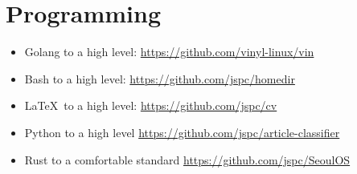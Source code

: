 \section{Programming}

\begin{itemize}
\item Golang to a high level: \href{https://github.com/vinyl-linux/vin}{https://github.com/vinyl-linux/vin}
\item Bash to a high level: \href{https://github.com/jspc/homedir}{https://github.com/jspc/homedir}
\item \LaTeX \ to a high level: \href{https://github.com/jspc/cv}{https://github.com/jspc/cv}
\item Python to a high level \href{https://github.com/jspc/article-classifier}{https://github.com/jspc/article-classifier}
\item Rust to a comfortable standard \href{https://github.com/jspc/SeoulOS}{https://github.com/jspc/SeoulOS}
\end{itemize}
